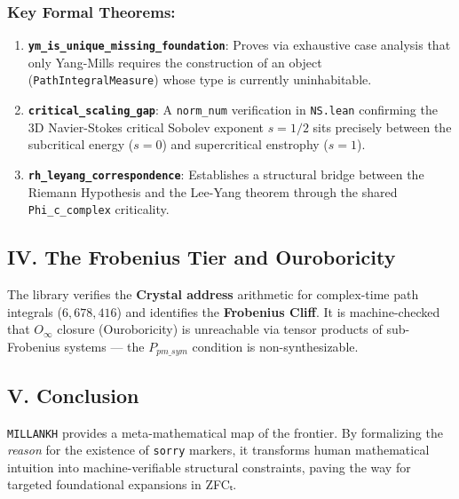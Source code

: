 \documentclass[12pt,a4paper]{article}
\begin{document}
\subsubsection{Key Formal Theorems:}

\begin{enumerate}
    \item \textbf{\texttt{ym\_is\_unique\_missing\_foundation}}: Proves via exhaustive case analysis that only Yang-Mills requires the construction of an object (\texttt{PathIntegralMeasure}) whose type is currently uninhabitable.
    \item \textbf{\texttt{critical\_scaling\_gap}}: A \texttt{norm\_num} verification in \texttt{NS.lean} confirming the 3D Navier-Stokes critical Sobolev exponent $s=1/2$ sits precisely between the subcritical energy ($s=0$) and supercritical enstrophy ($s=1$).
    \item \textbf{\texttt{rh\_leyang\_correspondence}}: Establishes a structural bridge between the Riemann Hypothesis and the Lee-Yang theorem through the shared \texttt{Phi\_c\_complex} criticality.
\end{enumerate}

\subsection{IV. The Frobenius Tier and Ouroboricity}

The library verifies the \textbf{Crystal address} arithmetic for complex-time path integrals ($6,678,416$) and identifies the \textbf{Frobenius Cliff}. It is machine-checked that $O_{\infty}$ closure (Ouroboricity) is unreachable via tensor products of sub-Frobenius systems --- the $P_{pm\_sym}$ condition is non-synthesizable.

\subsection{V. Conclusion}

\texttt{MILLANKH} provides a meta-mathematical map of the frontier. By formalizing the \emph{reason} for the existence of \texttt{sorry} markers, it transforms human mathematical intuition into machine-verifiable structural constraints, paving the way for targeted foundational expansions in ZFCₜ.
\end{document}
